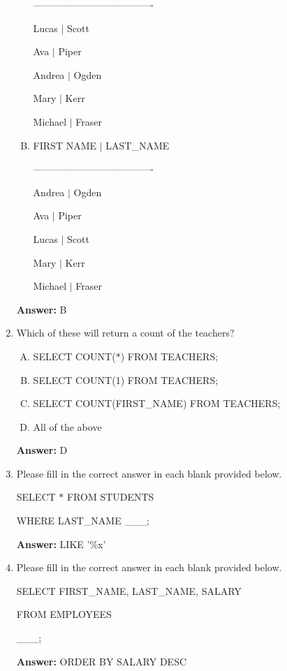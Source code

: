 \documentclass[12pt]{article}
\begin{document}
\begin{enumerate}[1.]
\begin{enumerate}[A.]
        -------------------------------------

        Lucas $\vert$ Scott

        Ava $\vert$   Piper

        Andrea $\vert$ Ogden

        Mary $\vert$  Kerr

        Michael $\vert$ Fraser
        \item
        FIRST NAME     $\vert$    LAST\_NAME

        -------------------------------------

        Andrea $\vert$ Ogden

        Ava $\vert$   Piper

        Lucas $\vert$ Scott

        Mary $\vert$  Kerr

        Michael $\vert$ Fraser
    \end{enumerate}

    \bigskip

    \textbf{Answer:} B

    \item

    Which of these will return a count of the teachers?

    \bigskip

    \begin{enumerate}[A.]
        \item SELECT COUNT($\ast$) FROM TEACHERS;
        \item SELECT COUNT(1) FROM TEACHERS;
        \item SELECT COUNT(FIRST\_NAME) FROM TEACHERS;
        \item All of the above
    \end{enumerate}

    \bigskip

    \textbf{Answer:} D


    \item

    Please fill in the correct answer in each blank provided below.

    \bigskip

    SELECT $\ast$ FROM STUDENTS

    WHERE LAST\_NAME \_\_\_;

    \bigskip

    \textbf{Answer:} LIKE '\%x'

    \item

    Please fill in the correct answer in each blank provided below.

    \bigskip

    SELECT FIRST\_NAME, LAST\_NAME, SALARY

    FROM EMPLOYEES

    \_\_\_;

    \bigskip

    \textbf{Answer:} ORDER BY SALARY DESC

\end{enumerate}
\end{document}
